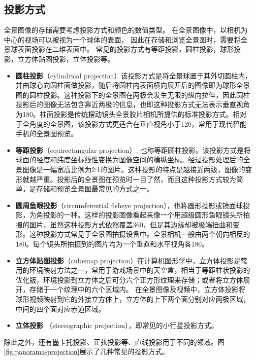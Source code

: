 \subsection{投影方式}
全景图像的存储需要考虑投影方式和颜色的数值类型。
在全景图像中，以相机为中心的视场可以被视为一个球体的表面，
因此在存储和浏览全景图时，需要将全景球表面投影在二维表面中。
常见的投影方式有等距投影，圆柱投影，球形投影，立方体贴图投影，立体投影等。
\begin{itemize}
\item \textbf{圆柱投影}（cylindrical projection）该投影方式是将全景球置于其外切圆柱内，并由球心向圆柱面做投影，随后将圆柱内表面横向展开后的图像即为球形全景图的圆柱投影。这种投影下的全景图在两极会发生无限的纵向拉伸，因此圆柱投影后的图像无法包含靠近两极的信息，也即这种投影方式无法表示垂直视角为180。柱面投影是传统摆动镜头全景胶片相机所提供的标准投影方式。相对于全角度的全景图，该投影方式更适合在垂直视角小于120，常用于现代智能手机的全景图预览。
\item \textbf{等距投影}（equirectangular projection）, 也称等距圆柱投影。该投影方式是将球面的经度和纬度坐标线性变换为图像空间的横纵坐标。经过投影处理后的全景图像是一幅宽高比例为2:1的图片。这种投影的特点是越接近两级，图像的变形就越严重。投影后的全景图在预览时一目了然，而且这种投影方式较为简单，是存储和预览全景图最常见的方式之一。
\item \textbf{圆周鱼眼投影}（circumferential fisheye projection），也称圆形投影或镜面球投影，为角投影的一种。这样的投影图像看起来像一个用超级圆形鱼眼镜头所拍摄的图片，虽然这种投影方式依然覆盖360，但是其边缘却被极端扭曲和变形。这种投影方式常见于全景图拍摄设备中。全景相机一般由两个朝向相反的180。每个镜头所拍摄到的图片均为一个垂直和水平视角各180。
\item \textbf{立方体贴图投影}（cubemap projection）在计算机图形学中，立方体投影是常用的环境映射方法之一，常用于游戏场景中的天空盒，相当于等距柱状投影的优化版，环境投影到立方体之后可分六个正方形纹理来存储；或者将立方体展开，存储于一个纹理中的六个区域内。 
在全景图像及视频中，立方体投影将球形视频映射到它的外接立方体上，立方体的上下两个面分别对应两极区域，中间的四个面对应赤道区域。
\item \textbf{立体投影} （stereographic projection），即常见的小行星投影方式。
\end{itemize}

除此之外，还有墨卡托投影、正弦投影等、直线投影用于不同的领域。图\ref{fig:panorama-projection}展示了几种常见的投影方式。

